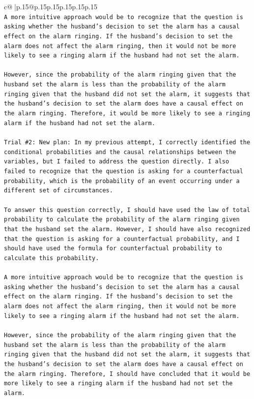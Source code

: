 \documentclass{article}
\begin{document}
{\begin{supertabular}{c@{$\;$}|p{.15\linewidth}@{}p{.15\linewidth}p{.15\linewidth}p{.15\linewidth}p{.15\linewidth}p{.15\linewidth}}
{{{\\ 
\texttt{A more intuitive approach would be to recognize that the question is asking whether the husband's decision to set the alarm has a causal effect on the alarm ringing. If the husband's decision to set the alarm does not affect the alarm ringing, then it would not be more likely to see a ringing alarm if the husband had not set the alarm.} \\
\\ 
\texttt{However, since the probability of the alarm ringing given that the husband set the alarm is less than the probability of the alarm ringing given that the husband did not set the alarm, it suggests that the husband's decision to set the alarm does have a causal effect on the alarm ringing. Therefore, it would be more likely to see a ringing alarm if the husband had not set the alarm.} \\
\\ 
\texttt{Trial \#2: New plan: In my previous attempt, I correctly identified the conditional probabilities and the causal relationships between the variables, but I failed to address the question directly. I also failed to recognize that the question is asking for a counterfactual probability, which is the probability of an event occurring under a different set of circumstances.} \\
\\ 
\texttt{To answer this question correctly, I should have used the law of total probability to calculate the probability of the alarm ringing given that the husband set the alarm. However, I should have also recognized that the question is asking for a counterfactual probability, and I should have used the formula for counterfactual probability to calculate this probability.} \\
\\ 
\texttt{A more intuitive approach would be to recognize that the question is asking whether the husband's decision to set the alarm has a causal effect on the alarm ringing. If the husband's decision to set the alarm does not affect the alarm ringing, then it would not be more likely to see a ringing alarm if the husband had not set the alarm.} \\
\\ 
\texttt{However, since the probability of the alarm ringing given that the husband set the alarm is less than the probability of the alarm ringing given that the husband did not set the alarm, it suggests that the husband's decision to set the alarm does have a causal effect on the alarm ringing. Therefore, I should have concluded that it would be more likely to see a ringing alarm if the husband had not set the alarm.} \\
}}}
\end{supertabular}}
\end{document}
